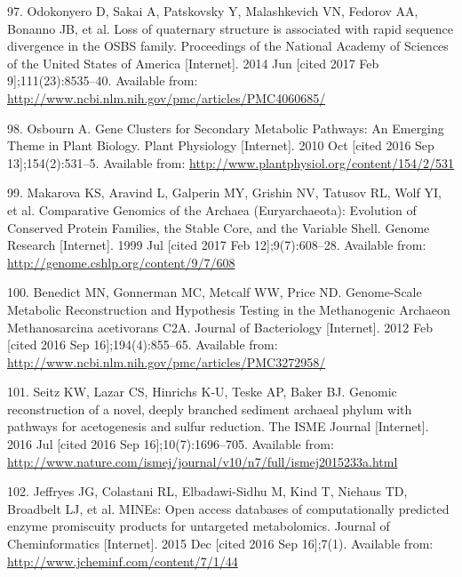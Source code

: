 \documentclass[12pt,twoside]{reedthesis}
\begin{document}
{  \hypertarget{ref-odokonyero_loss_2014}{}
  97. Odokonyero D, Sakai A, Patskovsky Y, Malashkevich VN, Fedorov AA,
  Bonanno JB, et al. Loss of quaternary structure is associated with rapid
  sequence divergence in the OSBS family. Proceedings of the National
  Academy of Sciences of the United States of America {[}Internet{]}. 2014
  Jun {[}cited 2017 Feb 9{]};111(23):8535--40. Available from:
  \url{http://www.ncbi.nlm.nih.gov/pmc/articles/PMC4060685/}
  
  \hypertarget{ref-osbourn_gene_2010}{}
  98. Osbourn A. Gene Clusters for Secondary Metabolic Pathways: An
  Emerging Theme in Plant Biology. Plant Physiology {[}Internet{]}. 2010
  Oct {[}cited 2016 Sep 13{]};154(2):531--5. Available from:
  \url{http://www.plantphysiol.org/content/154/2/531}
  
  \hypertarget{ref-makarova_comparative_1999}{}
  99. Makarova KS, Aravind L, Galperin MY, Grishin NV, Tatusov RL, Wolf
  YI, et al. Comparative Genomics of the Archaea (Euryarchaeota):
  Evolution of Conserved Protein Families, the Stable Core, and the
  Variable Shell. Genome Research {[}Internet{]}. 1999 Jul {[}cited 2017
  Feb 12{]};9(7):608--28. Available from:
  \url{http://genome.cshlp.org/content/9/7/608}
  
  \hypertarget{ref-benedict_genome-scale_2012}{}
  100. Benedict MN, Gonnerman MC, Metcalf WW, Price ND. Genome-Scale
  Metabolic Reconstruction and Hypothesis Testing in the Methanogenic
  Archaeon Methanosarcina acetivorans C2A. Journal of Bacteriology
  {[}Internet{]}. 2012 Feb {[}cited 2016 Sep 16{]};194(4):855--65.
  Available from:
  \url{http://www.ncbi.nlm.nih.gov/pmc/articles/PMC3272958/}
  
  \hypertarget{ref-seitz_genomic_2016}{}
  101. Seitz KW, Lazar CS, Hinrichs K-U, Teske AP, Baker BJ. Genomic
  reconstruction of a novel, deeply branched sediment archaeal phylum with
  pathways for acetogenesis and sulfur reduction. The ISME Journal
  {[}Internet{]}. 2016 Jul {[}cited 2016 Sep 16{]};10(7):1696--705.
  Available from:
  \url{http://www.nature.com/ismej/journal/v10/n7/full/ismej2015233a.html}
  
  \hypertarget{ref-jeffryes_mines_2015}{}
  102. Jeffryes JG, Colastani RL, Elbadawi-Sidhu M, Kind T, Niehaus TD,
  Broadbelt LJ, et al. MINEs: Open access databases of computationally
  predicted enzyme promiscuity products for untargeted metabolomics.
  Journal of Cheminformatics {[}Internet{]}. 2015 Dec {[}cited 2016 Sep
  16{]};7(1). Available from: \url{http://www.jcheminf.com/content/7/1/44}
  
}
\end{document}
